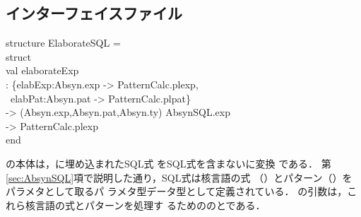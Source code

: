 \subsection{インターフェイスファイル}
\begin{program}
structure ElaborateSQL =\\
\myem  struct\\
\myem\myem     val elaborateExp\\
\myem\myem\myem   : \{elabExp:Absyn.exp -> PatternCalc.plexp,\\
\myem\myem\myem\myem\  elabPat:Absyn.pat -> PatternCalc.plpat\}\\
\myem\myem\myem\myem  -> (Absyn.exp,Absyn.pat,Absyn.ty) AbsynSQL.exp\\
\myem\myem\myem\myem  -> PatternCalc.plexp\\
\myem  end
\end{program}
	の本体は，\smlsharp{}に埋め込まれたSQL式
をSQL式を含まないに変換
である．
	第\ref{sec:AbsynSQL}項で説明した通り，SQL式は核言語の式
（）とパターン（）をパラメタとして取るパ
ラメタ型データ型として定義されている．
	の引数は，これら核言語の式とパターンを処理す
るためののとである．


\else%
\fi%

